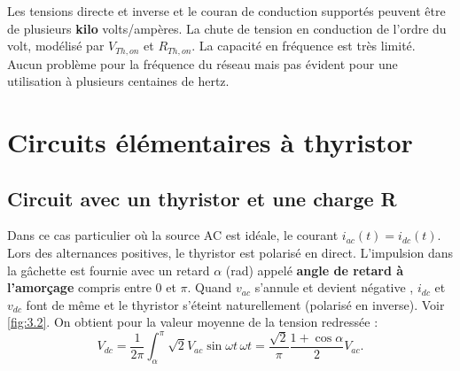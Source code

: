 		Les tensions directe et inverse et le couran de conduction supportés peuvent être de plusieurs \textbf{kilo} volts/ampères. La chute de tension en conduction de l'ordre du volt, modélisé par $V_{Th,on}$ et $R_{Th,on}$. La capacité en fréquence est très limité. Aucun problème pour la fréquence du réseau mais pas évident pour une utilisation à plusieurs centaines de hertz. 


	\section{Circuits élémentaires à thyristor}
		\subsection{Circuit avec un thyristor et une charge R}
			Dans ce cas particulier où la source AC est idéale, le courant $i_{ac}(t) = i_{dc}(t)$. Lors des alternances positives, le thyristor est polarisé en direct. L'impulsion dans la gâchette est fournie avec un retard $\alpha$ (rad) appelé \textbf{angle de retard à l'amorçage} compris entre 0 et $\pi$. Quand $v_{ac}$ s'annule et devient négative , $i_{dc}$ et $v_{dc}$ font de même et le thyristor s'éteint naturellement (polarisé en inverse). Voir \autoref{fig:3.2}. On obtient pour la valeur moyenne de la tension redressée :
			\begin{equation}
				V_{dc} = \frac{1}{2\pi}\int _\alpha ^\pi \sqrt{2} V_{ac} \sin \omega t \, \omega t = \frac{\sqrt{2}}{\pi} \frac{1+\cos \alpha}{2} V_{ac}.
			\end{equation}
			
